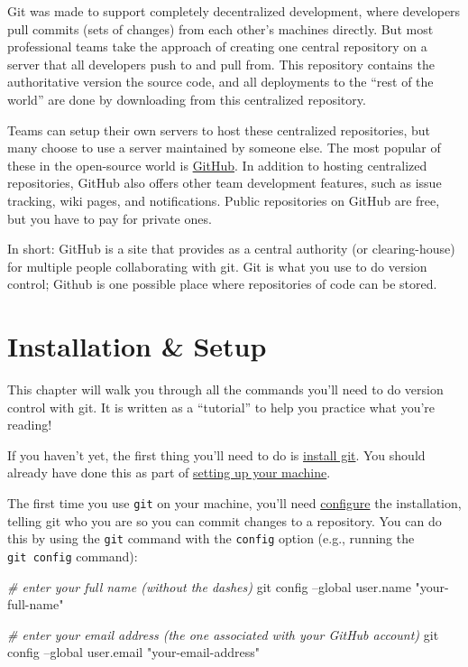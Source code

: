 \documentclass[]{book}
\newenvironment{Shaded}{\begin{snugshade}}{\end{snugshade}}
\newcommand{\StringTok}[1]{\textcolor[rgb]{0.31,0.60,0.02}{#1}}
\newcommand{\CommentTok}[1]{\textcolor[rgb]{0.56,0.35,0.01}{\textit{#1}}}
\newcommand{\FunctionTok}[1]{\textcolor[rgb]{0.00,0.00,0.00}{#1}}
\newcommand{\NormalTok}[1]{#1}
\theoremstyle{definition}
\theoremstyle{definition}
\theoremstyle{remark}
\begin{document}
Git was made to support completely decentralized development, where
developers pull commits (sets of changes) from each other's machines
directly. But most professional teams take the approach of creating one
central repository on a server that all developers push to and pull
from. This repository contains the authoritative version the source
code, and all deployments to the ``rest of the world'' are done by
downloading from this centralized repository.

Teams can setup their own servers to host these centralized
repositories, but many choose to use a server maintained by someone
else. The most popular of these in the open-source world is
\href{https://github.com/}{GitHub}. In addition to hosting centralized
repositories, GitHub also offers other team development features, such
as issue tracking, wiki pages, and notifications. Public repositories on
GitHub are free, but you have to pay for private ones.

In short: GitHub is a site that provides as a central authority (or
clearing-house) for multiple people collaborating with git. Git is what
you use to do version control; Github is one possible place where
repositories of code can be stored.

\section{Installation \& Setup}\label{installation-setup}

This chapter will walk you through all the commands you'll need to do
version control with git. It is written as a ``tutorial'' to help you
practice what you're reading!

If you haven't yet, the first thing you'll need to do is
\href{http://git-scm.com/downloads}{install git}. You should already
have done this as part of \protect\hyperlink{setup-machine}{setting up
your machine}.

The first time you use \texttt{git} on your machine, you'll need
\href{https://help.github.com/articles/set-up-git/}{configure} the
installation, telling git who you are so you can commit changes to a
repository. You can do this by using the \texttt{git} command with the
\texttt{config} option (e.g., running the \texttt{git\ config} command):

\begin{Shaded}
\begin{Highlighting}[]
\CommentTok{# enter your full name (without the dashes)}
\FunctionTok{git}\NormalTok{ config --global user.name }\StringTok{"your-full-name"}

\CommentTok{# enter your email address (the one associated with your GitHub account)}
\FunctionTok{git}\NormalTok{ config --global user.email }\StringTok{"your-email-address"}
\end{Highlighting}
\end{Shaded}
\end{document}
